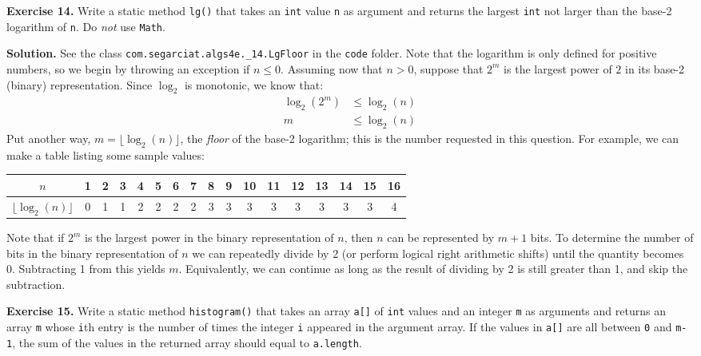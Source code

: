 \documentclass[12pt, a4paper]{article}
\newenvironment{ex}[2][Exercise]
{\par\medskip\noindent \textbf{#1 #2.}}
{\medskip}
\newenvironment{sol}[1][Solution]
{\par\medskip\noindent \textbf{#1.} }
{\medskip}
\begin{document}
	\begin{ex}{14}
		Write a static method \texttt{lg()} that takes an \texttt{int} value \texttt{n}
		as argument and returns the largest \texttt{int} not larger than the base-2 logarithm
		of \texttt{n}. Do \emph{not} use \texttt{Math}.
	\end{ex}
	\begin{sol}
		See the class \texttt{com.segarciat.algs4e.\_14.LgFloor} in the \texttt{code} folder.
		Note that the logarithm is only defined for positive numbers,
		so we begin by throwing an exception if $n \leq 0$. Assuming now that
		$n > 0$, suppose that $2^m$ is the largest power of $2$ in its base-2 (binary)
		representation. Since $\log_2$ is monotonic, we know that:
		\begin{align*}
			\log_2(2^m)&\leq \log_2(n)\\
			m&\leq  \log_2(n)
		\end{align*}
		Put another way, $m = \lfloor \log_2(n)\rfloor$, the \emph{floor} of the base-2
		logarithm; this is the number requested in this question. For example, we can
		make a table listing some sample values:
		\begin{center}
			\begin{tabular}{c|cccccccccccccccc}
				$n$ & 1 & 2 & 3 & 4 & 5 & 6 & 7 & 8 & 9 & 10 & 11 & 12 & 13 & 14 & 15 & 16\\
				\hline
				$\lfloor \log_2(n)\rfloor$ & 0 & 1 & 1 & 2 & 2 & 2 & 2 & 3 & 3 & 3 & 3 & 3 & 3
				& 3 & 3 & 4
			\end{tabular}
		\end{center}
		Note that if $2^m$ is the largest power in the binary representation of $n$, then
		$n$ can be represented by $m + 1$ bits. To determine the number of bits in the
		binary representation of $n$ we can repeatedly divide by 2 (or perform logical right
		arithmetic shifts) until the quantity becomes 0. Subtracting 1 from this yields
		$m$. Equivalently, we can continue as long as the result of dividing by 2 is still
		greater than 1, and skip the subtraction.
	\end{sol}
	\begin{ex}{15}
		Write a static method \texttt{histogram()} that takes an array \texttt{a[]}
		of \texttt{int} values and an integer \texttt{m} as arguments and returns
		an array \texttt{m} whose \texttt{i}th entry is the number of times the integer
		\texttt{i} appeared in the argument array. If the values in \texttt{a[]} are all
		between \texttt{0} and \texttt{m-1}, the sum of the values in the returned array
		should equal to \texttt{a.length}.
	\end{ex}
\end{document}

